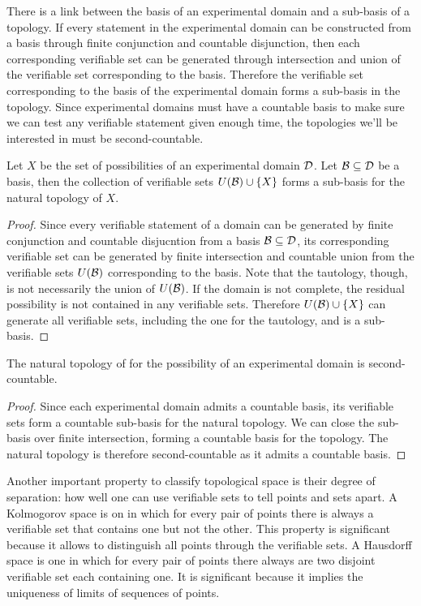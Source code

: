 \documentclass[11pt,letterpaper,fleqn]{memoir} %
\begin{document}
There is a link between the basis of an experimental domain and a sub-basis of a topology. If every statement in the experimental domain can be constructed from a basis through finite conjunction and countable disjunction, then each corresponding verifiable set can be generated through intersection and union of the verifiable set corresponding to the basis. Therefore the verifiable set corresponding to the basis of the experimental domain forms a sub-basis in the topology. Since experimental domains must have a countable basis to make sure we can test any verifiable statement given enough time, the topologies we'll be interested in must be second-countable.

\begin{mathSection}
	\begin{prop}
		Let $X$ be the set of possibilities of an experimental domain $\mathcal{D}$. Let $\mathcal{B} \subseteq \mathcal{D}$ be a basis, then the collection of verifiable sets $U(\mathcal{B})\cup\{X\}$ forms a sub-basis for the natural topology of $X$.
	\end{prop}
	\begin{proof}
		Since every verifiable statement of a domain can be generated by finite conjunction and countable disjucntion from a basis $\mathcal{B} \subseteq \mathcal{D}$, its corresponding verifiable set can be generated by finite intersection and countable union from the verifiable sets $U(\mathcal{B})$ corresponding to the basis. Note that the tautology, though, is not necessarily the union of $U(\mathcal{B})$. If the domain is not complete, the residual possibility is not contained in any verifiable sets. Therefore $U(\mathcal{B})\cup\{X\}$ can generate all verifiable sets, including the one for the tautology, and is a sub-basis.
	\end{proof}
	\begin{prop}
		The natural topology of for the possibility of an experimental domain is second-countable.
	\end{prop}
	\begin{proof}
		Since each experimental domain admits a countable basis, its verifiable sets form a countable sub-basis for the natural topology. We can close the sub-basis over finite intersection, forming a countable basis for the topology. The natural topology is therefore second-countable as it admits a countable basis.
\end{proof}
\end{mathSection}

Another important property to classify topological space is their degree of separation: how well one can use verifiable sets to tell points and sets apart. A Kolmogorov space is on in which for every pair of points there is always a verifiable set that contains one but not the other. This property is significant because it allows to distinguish all points through the verifiable sets. A Hausdorff space is one in which for every pair of points there always are two disjoint verifiable set each containing one. It is significant because it implies the uniqueness of limits of sequences of points.
\end{document}
